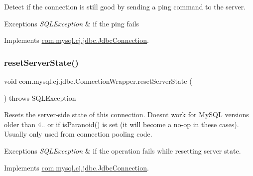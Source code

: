 Detect if the connection is still good by sending a ping command to the server.


\begin{DoxyExceptions}{Exceptions}
{\em S\+Q\+L\+Exception} & if the ping fails \\
\hline
\end{DoxyExceptions}


Implements \mbox{\hyperlink{interfacecom_1_1mysql_1_1cj_1_1jdbc_1_1_jdbc_connection_a6d078258f83ddc438d64bafb0f665004}{com.\+mysql.\+cj.\+jdbc.\+Jdbc\+Connection}}.

\mbox{\label{classcom_1_1mysql_1_1cj_1_1jdbc_1_1_connection_wrapper_a420204849914ad076e502ba7753ba6b5}} 
\subsubsection{\texorpdfstring{reset\+Server\+State()}{resetServerState()}}
{\footnotesize\ttfamily void com.\+mysql.\+cj.\+jdbc.\+Connection\+Wrapper.\+reset\+Server\+State (\begin{DoxyParamCaption}{ }\end{DoxyParamCaption}) throws S\+Q\+L\+Exception}

Resets the server-\/side state of this connection. Doesn\textquotesingle{}t work for My\+S\+QL versions older than 4.. or if is\+Paranoid() is set (it will become a no-\/op in these cases). Usually only used from connection pooling code.


\begin{DoxyExceptions}{Exceptions}
{\em S\+Q\+L\+Exception} & if the operation fails while resetting server state. \\
\hline
\end{DoxyExceptions}


Implements \mbox{\hyperlink{interfacecom_1_1mysql_1_1cj_1_1jdbc_1_1_jdbc_connection_a44456aec7737354a14eff20638c047fa}{com.\+mysql.\+cj.\+jdbc.\+Jdbc\+Connection}}.

\mbox{\label{classcom_1_1mysql_1_1cj_1_1jdbc_1_1_connection_wrapper_aa430608c339c22aff456a59210faaf8b}} 
